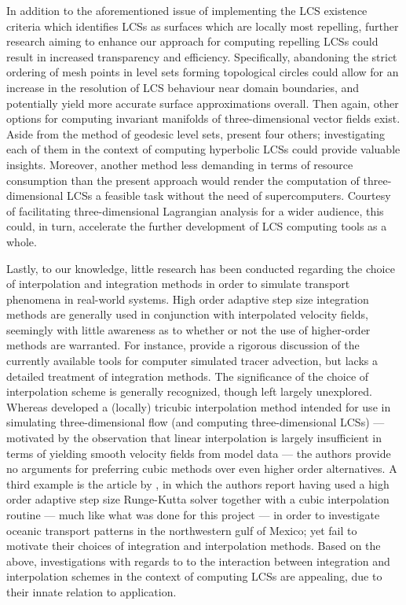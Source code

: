 In addition to the aforementioned issue of implementing the LCS existence
criteria which identifies LCSs as surfaces which are locally most repelling,
further research aiming to enhance our approach for computing repelling LCSs
could result in increased transparency and efficiency. Specifically,
abandoning the strict ordering of mesh points in level sets forming topological
circles could allow for an increase in the resolution of LCS behaviour near
domain boundaries, and potentially yield more accurate surface approximations
overall. Then again, other options for computing invariant manifolds of
three-dimensional vector fields exist. Aside from the method of geodesic level
sets, \textcite{krauskopf2005survey} present four others; investigating each of
them in the context of computing hyperbolic LCSs could provide valuable
insights. Moreover, another method less demanding in terms of resource
consumption than the present approach would render the computation of
three-dimensional LCSs a feasible task without the need of supercomputers.
Courtesy of facilitating three-dimensional Lagrangian analysis for a wider
audience, this could, in turn, accelerate the further development of LCS
computing tools as a whole.

Lastly, to our knowledge, little research has been conducted regarding the
choice of interpolation and integration methods in order to simulate transport
phenomena in real-world systems. High order adaptive step size integration
methods are generally used in conjunction with interpolated velocity fields,
seemingly with little awareness as to whether or not the use of higher-order
methods are warranted. For instance, \textcite{vansebille2018lagrangian}
provide a rigorous discussion of the currently available tools for computer
simulated tracer advection, but lacks a detailed treatment of integration
methods. The significance of the choice of interpolation scheme is generally
recognized, though left largely unexplored. Whereas
\textcite{lekien2005tricubic} developed a (locally) tricubic interpolation
method intended for use in simulating three-dimensional flow (and computing
three-dimensional LCSs) --- motivated by the observation that linear
interpolation is largely insufficient in terms of yielding smooth velocity
fields from model data --- the authors provide no arguments for preferring
cubic methods over even higher order alternatives. A third example is the
article by \textcite{gough2017persistent}, in which the authors report having
used a high order adaptive step size Runge-Kutta solver together with a cubic
interpolation routine --- much like what was done for this project --- in order
to investigate oceanic transport patterns in the northwestern gulf of Mexico;
yet fail to motivate their choices of integration and interpolation methods.
Based on the above, investigations with regards to to the interaction between
integration and interpolation schemes in the context of computing LCSs are
appealing, due to their innate relation to application.

